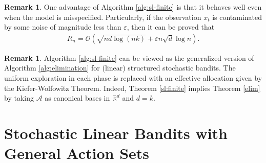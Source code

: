 \documentclass[letterpaper,11pt,openright,openany]{book}
\numberwithin{equation}{section}
\theoremstyle{plain}
\theoremstyle{definition}
\newtheorem{Rem}[Th]{Remark}
\def\R{{\mathbb R}}
\def\R{{\mathbb R}}
\def\e{{\varepsilon}}
\begin{document}
\begin{Rem}
One advantage of Algorithm \ref{alg:sl-finite} is that it behaves well even when the model is misspecified. Particularly, if the observation $x_t$ is contaminated by some noise of magnitude less than $\e$, then it can be proved that 
\begin{align*}
R_n=\mathcal O\left(\sqrt{nd\log (nk)}+\e n\sqrt{d}\log n\right). 
\end{align*}
\end{Rem}

\begin{Rem}
Algorithm \ref{alg:sl-finite} can be viewed as the generalized version of Algorithm \ref{alg:elimination} for (linear) structured stochastic bandits. The uniform exploration in each phase is replaced with an effective allocation given by the Kiefer-Wolfowitz Theorem. Indeed, Theorem \ref{sl:finite} implies Theorem \ref{elim} by taking $\mathcal A$ as canonical bases in $\R^d$ and $d=k$.  
\end{Rem}

\section{Stochastic Linear Bandits with General Action Sets}
\end{document}
